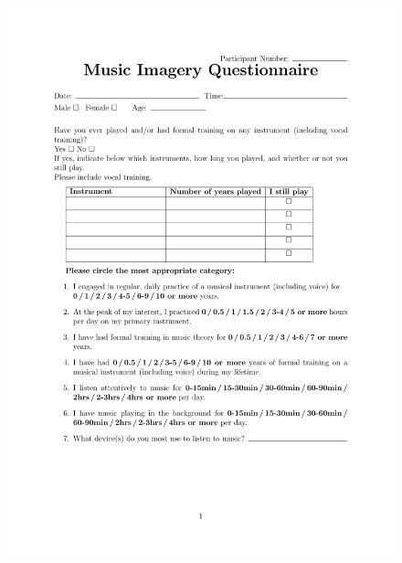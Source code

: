 \begin{figure}[h]
   \centerline{\includegraphics[page=3,scale=0.75,trim={0in 1in 0in 0.5in},clip]{Figures/questionnaire.pdf}}
\end{figure}